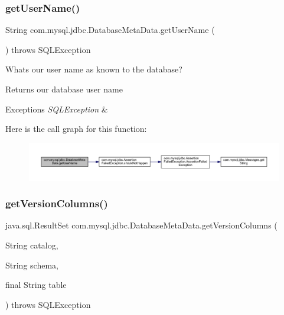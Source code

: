 \subsubsection{\texorpdfstring{get\+User\+Name()}{getUserName()}}
{\footnotesize\ttfamily String com.\+mysql.\+jdbc.\+Database\+Meta\+Data.\+get\+User\+Name (\begin{DoxyParamCaption}{ }\end{DoxyParamCaption}) throws S\+Q\+L\+Exception}

What\textquotesingle{}s our user name as known to the database?

\begin{DoxyReturn}{Returns}
our database user name 
\end{DoxyReturn}

\begin{DoxyExceptions}{Exceptions}
{\em S\+Q\+L\+Exception} & \\
\hline
\end{DoxyExceptions}
Here is the call graph for this function\+:
\nopagebreak
\begin{figure}[H]
\begin{center}
\leavevmode
\includegraphics[width=350pt]{classcom_1_1mysql_1_1jdbc_1_1_database_meta_data_a1f97c63faa2be640a74c5267cd022212_cgraph}
\end{center}
\end{figure}
\mbox{\label{classcom_1_1mysql_1_1jdbc_1_1_database_meta_data_ad37428c615c19cdc6330887196659957}} 
\subsubsection{\texorpdfstring{get\+Version\+Columns()}{getVersionColumns()}}
{\footnotesize\ttfamily java.\+sql.\+Result\+Set com.\+mysql.\+jdbc.\+Database\+Meta\+Data.\+get\+Version\+Columns (\begin{DoxyParamCaption}\item[{String}]{catalog,  }\item[{String}]{schema,  }\item[{final String}]{table }\end{DoxyParamCaption}) throws S\+Q\+L\+Exception}

